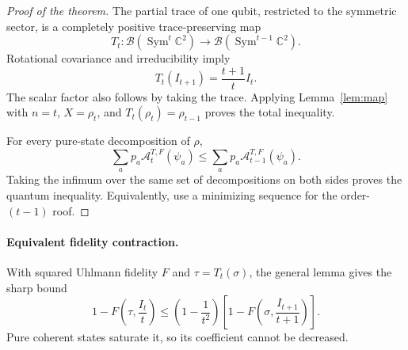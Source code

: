 \documentclass[11pt]{article}
\newcommand{\A}{\mathcal A}
\begin{document}
\begin{proof}[Proof of the theorem]
The partial trace of one qubit, restricted to the symmetric sector, is a completely positive trace-preserving map
\[
 T_t:\mathcal B(\operatorname{Sym}^t\mathbb C^2)
 \longrightarrow\mathcal B(\operatorname{Sym}^{t-1}\mathbb C^2).
\]
Rotational covariance and irreducibility imply
\[
 T_t(I_{t+1})=\frac{t+1}{t}I_t.
\]
The scalar factor also follows by taking the trace. Applying Lemma~\ref{lem:map} with $n=t$, $X=\rho_t$, and $T_t(\rho_t)=\rho_{t-1}$ proves the total inequality.

For every pure-state decomposition of $\rho$,
\[
 \sum_a p_a\A_t^{T,F}(\psi_a)
 \le\sum_a p_a\A_{t-1}^{T,F}(\psi_a).
\]
Taking the infimum over the same set of decompositions on both sides proves the quantum inequality. Equivalently, use a minimizing sequence for the order-$(t-1)$ roof.
\end{proof}

\paragraph{Equivalent fidelity contraction.}
With squared Uhlmann fidelity $F$ and $\tau=T_t(\sigma)$, the general lemma gives the sharp bound
\[
 1-F\left(\tau,\frac{I_t}{t}\right)
 \le\left(1-\frac1{t^2}\right)
 \left[1-F\left(\sigma,\frac{I_{t+1}}{t+1}\right)\right].
\]
Pure coherent states saturate it, so its coefficient cannot be decreased.


\clearpage
\end{document}
